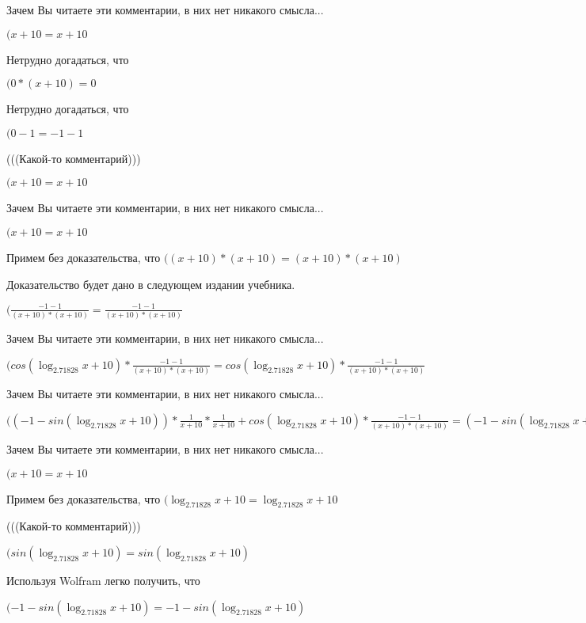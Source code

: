 \documentclass[12pt,a4paper,fleqn]{article}
\theoremstyle{definition}
\begin{document}
Зачем Вы читаете эти комментарии, в них нет никакого смысла...

$( x  +  10  =  x  +  10 $

Нетрудно догадаться, что

$( 0  * ( x  +  10 ) =  0 $

Нетрудно догадаться, что

$( 0  -  1  =  -1  -  1 $

(((Какой-то комментарий)))

$( x  +  10  =  x  +  10 $

Зачем Вы читаете эти комментарии, в них нет никакого смысла...

$( x  +  10  =  x  +  10 $

Примем без доказательства, что
$(( x  +  10 ) * ( x  +  10 ) = ( x  +  10 ) * ( x  +  10 )$

Доказательство будет дано в следующем издании учебника.

$(\frac{ -1  -  1 }{( x  +  10 ) * ( x  +  10 )}
 = \frac{ -1  -  1 }{( x  +  10 ) * ( x  +  10 )}
$

Зачем Вы читаете эти комментарии, в них нет никакого смысла...

$(cos(\log_{ 2.71828 }{ x  +  10 }) * \frac{ -1  -  1 }{( x  +  10 ) * ( x  +  10 )}
 = cos(\log_{ 2.71828 }{ x  +  10 }) * \frac{ -1  -  1 }{( x  +  10 ) * ( x  +  10 )}
$

Зачем Вы читаете эти комментарии, в них нет никакого смысла...

$(( -1  - sin(\log_{ 2.71828 }{ x  +  10 })) * \frac{ 1 }{ x  +  10 }
 * \frac{ 1 }{ x  +  10 }
 + cos(\log_{ 2.71828 }{ x  +  10 }) * \frac{ -1  -  1 }{( x  +  10 ) * ( x  +  10 )}
 = ( -1  - sin(\log_{ 2.71828 }{ x  +  10 })) * \frac{ 1 }{ x  +  10 }
 * \frac{ 1 }{ x  +  10 }
 + cos(\log_{ 2.71828 }{ x  +  10 }) * \frac{ -1  -  1 }{( x  +  10 ) * ( x  +  10 )}
$

Зачем Вы читаете эти комментарии, в них нет никакого смысла...

$( x  +  10  =  x  +  10 $

Примем без доказательства, что
$(\log_{ 2.71828 }{ x  +  10 } = \log_{ 2.71828 }{ x  +  10 }$

(((Какой-то комментарий)))

$(sin(\log_{ 2.71828 }{ x  +  10 }) = sin(\log_{ 2.71828 }{ x  +  10 })$

Используя Wolfram легко получить, что

$( -1  - sin(\log_{ 2.71828 }{ x  +  10 }) =  -1  - sin(\log_{ 2.71828 }{ x  +  10 })$
\end{document}
